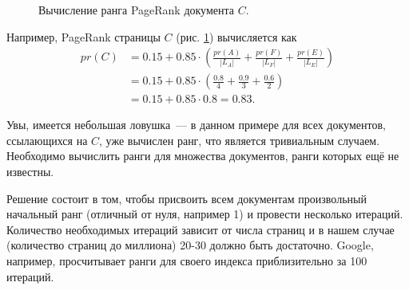 \begin{figure}[h]
  \centering
  \caption{Вычисление ранга PageRank документа $C$.}
  \label{fig:pagerank}
\end{figure}

Например, PageRank страницы $C$ (рис. \ref{fig:pagerank}) вычисляется как
\begin{equation}
  \begin{split}
    pr(C) &= 0.15 + 0.85\cdot\left(\frac{pr(A)}{|L_A|}+\frac{pr(F)}{|L_F|}+\frac{pr(E)}{|L_E|}\right)\\
    &= 0.15 + 0.85\cdot\left(\frac{0.8}{4}+\frac{0.9}{3}+\frac{0.6}{2}\right)\\
    &= 0.15 + 0.85\cdot 0.8 = 0.83.
  \end{split}
\end{equation}

Увы, имеется небольшая ловушка~--- в данном примере для всех документов, ссылающихся на $C$, уже вычислен ранг, что является тривиальным случаем. Необходимо вычислить ранги для множества документов, ранги которых ещё не известны.

Решение состоит в том, чтобы присвоить всем документам произвольный начальный ранг (отличный от нуля, например 1) и провести несколько итераций. Количество необходимых итераций зависит от числа страниц и в нашем случае (количество страниц до миллиона) 20-30 должно быть достаточно. Google, например, просчитывает ранги для своего индекса приблизительно за 100 итераций.

